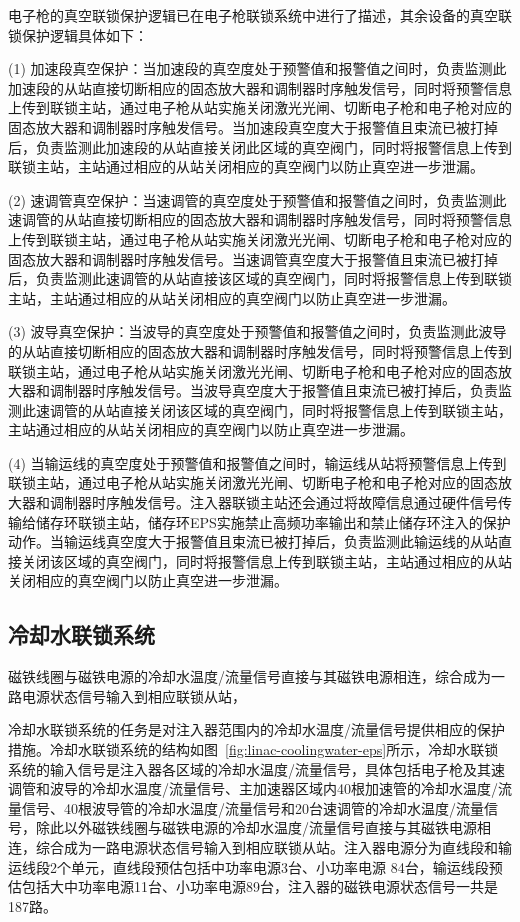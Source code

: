 电子枪的真空联锁保护逻辑已在电子枪联锁系统中进行了描述，其余设备的真空联锁保护逻辑具体如下：

(1) 加速段真空保护：当加速段的真空度处于预警值和报警值之间时，负责监测此加速段的从站直接切断相应的固态放大器和调制器时序触发信号，同时将预警信息上传到联锁主站，通过电子枪从站实施关闭激光光闸、切断电子枪和电子枪对应的固态放大器和调制器时序触发信号。当加速段真空度大于报警值且束流已被打掉后，负责监测此加速段的从站直接关闭此区域的真空阀门，同时将报警信息上传到联锁主站，主站通过相应的从站关闭相应的真空阀门以防止真空进一步泄漏。

(2) 速调管真空保护：当速调管的真空度处于预警值和报警值之间时，负责监测此速调管的从站直接切断相应的固态放大器和调制器时序触发信号，同时将预警信息上传到联锁主站，通过电子枪从站实施关闭激光光闸、切断电子枪和电子枪对应的固态放大器和调制器时序触发信号。当速调管真空度大于报警值且束流已被打掉后，负责监测此速调管的从站直接该区域的真空阀门，同时将报警信息上传到联锁主站，主站通过相应的从站关闭相应的真空阀门以防止真空进一步泄漏。

(3) 波导真空保护：当波导的真空度处于预警值和报警值之间时，负责监测此波导的从站直接切断相应的固态放大器和调制器时序触发信号，同时将预警信息上传到联锁主站，通过电子枪从站实施关闭激光光闸、切断电子枪和电子枪对应的固态放大器和调制器时序触发信号。当波导真空度大于报警值且束流已被打掉后，负责监测此速调管的从站直接关闭该区域的真空阀门，同时将报警信息上传到联锁主站，主站通过相应的从站关闭相应的真空阀门以防止真空进一步泄漏。

(4) 当输运线的真空度处于预警值和报警值之间时，输运线从站将预警信息上传到联锁主站，通过电子枪从站实施关闭激光光闸、切断电子枪和电子枪对应的固态放大器和调制器时序触发信号。注入器联锁主站还会通过将故障信息通过硬件信号传输给储存环联锁主站，储存环EPS实施禁止高频功率输出和禁止储存环注入的保护动作。当输运线真空度大于报警值且束流已被打掉后，负责监测此输运线的从站直接关闭该区域的真空阀门，同时将报警信息上传到联锁主站，主站通过相应的从站关闭相应的真空阀门以防止真空进一步泄漏。

\subsection{冷却水联锁系统}


磁铁线圈与磁铁电源的冷却水温度/流量信号直接与其磁铁电源相连，综合成为一路电源状态信号输入到相应联锁从站，


冷却水联锁系统的任务是对注入器范围内的冷却水温度/流量信号提供相应的保护措施。冷却水联锁系统的结构如图~\ref{fig:linac-coolingwater-eps}所示，冷却水联锁系统的输入信号是注入器各区域的冷却水温度/流量信号，具体包括电子枪及其速调管和波导的冷却水温度/流量信号、主加速器区域内40根加速管的冷却水温度/流量信号、40根波导管的冷却水温度/流量信号和20台速调管的冷却水温度/流量信号，除此以外磁铁线圈与磁铁电源的冷却水温度/流量信号直接与其磁铁电源相连，综合成为一路电源状态信号输入到相应联锁从站。注入器电源分为直线段和输运线段2个单元，直线段预估包括中功率电源3台、小功率电源 84台，输运线段预估包括大中功率电源11台、小功率电源89台，注入器的磁铁电源状态信号一共是187路\cite{sun2018}。


